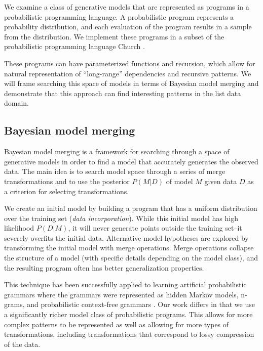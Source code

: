 \documentclass[a4paper,10pt]{article}
\begin{document}
We examine a class of generative models that are represented as programs in a probabilistic programming language. A probabilistic program represents a probability distribution, and each evaluation of the program results in a sample from the distribution. We implement these programs in a subset of the probabilistic programming language Church \cite{N.D.Goodman:2008:f2a0d}.  

These programs can have parameterized functions and recursion, which allow for natural representation of ``long-range'' dependencies and recursive patterns.  We will frame searching this space of models in terms of Bayesian model merging \cite{Stolcke:1994:IPG:645515.658235} and demonstrate that this approach can find interesting patterns in the list data domain.


\subsection{Bayesian model merging}

Bayesian model merging is a framework for searching through a space of generative models in order to find a model that accurately generates the observed data.  The main idea is to search model space through a series of merge transformations and to use the posterior $P(M|D)$ of model $M$ given data $D$ as a criterion for selecting transformations.

We create an initial model by building a program that has a uniform distribution over the training set ({\em data incorporation}).  While this initial model has high likelihood $P(D|M)$, it will never generate points outside the training set--it severely overfits the initial data.  Alternative model hypotheses are explored by transforming the initial model with merge operations.  Merge operations collapse the structure of a model (with specific details depending on the model class), and the resulting program often has better generalization properties.  

This technique has been successfully applied to learning artificial probabilistic grammars where the grammars were represented as hidden Markov models, n-grams, and probabilistic context-free grammars \cite{Stolcke:1994:IPG:645515.658235}. Our work differs in that we use a significantly richer model class of probabilistic programs.  This allows for more complex patterns to be represented as well as allowing for more types of transformations, including transformations that correspond to lossy compression of the data.
\end{document}
